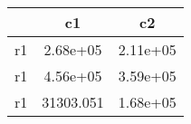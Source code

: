 \begin{table}[htbp]
\begin{tabular}{lcc} \hline \hline
 & c1  & c2  \\  \hline 
r1 &  2.68e+05 &  2.11e+05 \\  
r1 &  4.56e+05 &  3.59e+05 \\  
r1 & 31303.051 &  1.68e+05 \\  
\hline \hline \end{tabular}
\end{table}
